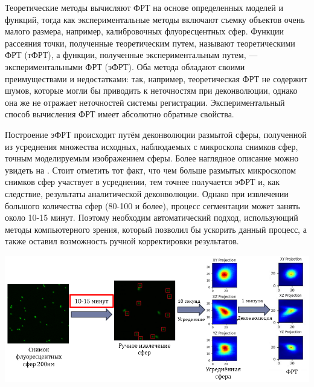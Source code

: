 \par Теоретические методы вычисляют ФРТ на основе определенных моделей и функций, тогда как экспериментальные методы включают съемку объектов очень малого размера, например, калибровочных флуоресцентных сфер. Функции рассеяния точки, полученные теоретическим путем, называют теоретическими ФРТ (тФРТ), а функции, полученные экспериментальным путем, — экспериментальными ФРТ (эФРТ). Оба метода обладают своими преимуществами и недостатками: так, например, теоретическая ФРТ не содержит шумов, которые могли бы приводить к неточностям при деконволюции, однако она же не отражает неточностей системы регистрации. Экспериментальный способ вычисления ФРТ имеет абсолютно обратные свойства.

\par Построение эФРТ происходит путём деконволюции размытой сферы, полученной из усреднения множества исходных, наблюдаемых с микроскопа снимков сфер, точным моделируемым изображением сферы. Более наглядное описание можно увидеть на . Стоит отметить тот факт, что чем больше размытых микроскопом снимков сфер участвует в усреднении, тем точнее получается эФРТ и, как следствие, результаты  аналитической деконволюции. Однако при извлечении большого количества сфер (80-100 и более), процесс сегментации может занять около 10-15 минут. Поэтому необходим автоматический подход, использующий методы компьютерного зрения, который позволил бы ускорить данный процесс, а также оставил возможность ручной корректировки результатов.
\begin{minipage}{\textwidth}
	\centering
	\vspace{\mfloatsep} %
	\includegraphics[keepaspectratio=true,scale=0.85] {my_folder/images/problem/segment_spheres.png}
	\label{fig:autosegm-problem}  
	\vspace{\mfloatsep} %
\end{minipage}

